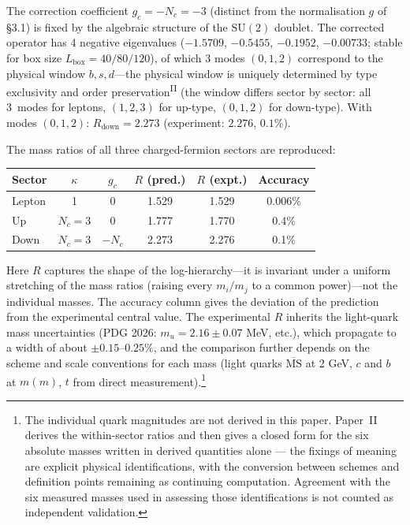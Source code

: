 \documentclass[12pt,a4paper]{article}
\newcommand{\PII}{\textsuperscript{\textup{II}}}
\begin{document}
The correction coefficient $g_c = -N_c = -3$ (distinct from the normalisation $g$ of \S3.1) is fixed by the algebraic structure of the $\mathrm{SU}(2)$ doublet. The corrected operator has 4 negative eigenvalues ($-1.5709$, $-0.5455$, $-0.1952$, $-0.00733$; stable for box size $L_\mathrm{box} = 40/80/120$), of which 3 modes $(0,1,2)$ correspond to the physical window $b, s, d$---the physical window is uniquely determined by type exclusivity and order preservation\PII{} (the window differs sector by sector: all 3~modes for leptons, $(1,2,3)$ for up-type, $(0,1,2)$ for down-type). With modes $(0,1,2)$: $R_\mathrm{down} = 2.273$ (experiment: $2.276$, $0.1\%$).

The mass ratios of all three charged-fermion sectors are reproduced:

\begin{center}\small
\begin{tabular}{lccccc}
\toprule
Sector & $\kappa$ & $g_c$ & $R$ (pred.) & $R$ (expt.) & Accuracy \\
\midrule
Lepton  & 1 & 0 & 1.529 & 1.529 & 0.006\% \\
Up      & $N_c = 3$ & 0 & 1.777 & 1.770 & 0.4\% \\
Down    & $N_c = 3$ & $-N_c$ & 2.273 & 2.276 & 0.1\% \\
\bottomrule
\end{tabular}
\end{center}

\noindent Here $R$ captures the shape of the log-hierarchy---it is invariant under a uniform stretching of the mass ratios (raising every $m_i/m_j$ to a common power)---not the individual masses. The accuracy column gives the deviation of the prediction from the experimental central value. The experimental $R$ inherits the light-quark mass uncertainties (PDG 2026: $m_u = 2.16 \pm 0.07$ MeV, etc.), which propagate to a width of about $\pm0.15$--$0.25\%$, and the comparison further depends on the scheme and scale conventions for each mass (light quarks $\overline{\mathrm{MS}}$ at 2 GeV, $c$ and $b$ at $m(m)$, $t$ from direct measurement).\footnote{The individual quark magnitudes are not derived in this paper. Paper~II derives the within-sector ratios and then gives a closed form for the six absolute masses written in derived quantities alone — the fixings of meaning are explicit physical identifications, with the conversion between schemes and definition points remaining as continuing computation. Agreement with the six measured masses used in assessing those identifications is not counted as independent validation.}
\end{document}
